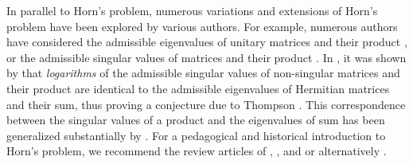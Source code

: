 \documentclass[notitlepage, 10pt]{article}
\begin{document}
In parallel to Horn's problem, numerous variations and extensions of Horn's problem have been explored by various authors.
For example, numerous authors have considered the admissible eigenvalues of unitary matrices and their product \cite{agnihotri1997eigenvalues,belkale2008quantum,belkale2016multiplicative}, or the admissible singular values of matrices and their product \cite{speyer2005horn,thompson1971eigenvaluesviii}.
In \citeyear{klyachko2000random}, it was shown by \cite{klyachko2000random} that \textit{logarithms} of the admissible singular values of non-singular matrices and their product are identical to the admissible eigenvalues of Hermitian matrices and their sum, thus proving a conjecture due to Thompson \cite{klyachko2000random}.
This correspondence between the singular values of a product and the eigenvalues of sum has been generalized substantially by \citeauthor{alekseev2001linearization} \cite{alekseev2001linearization}.
For a pedagogical and historical introduction to Horn's problem, we recommend the review articles of \citeauthor{bhatia2001linear} \cite{bhatia2001linear}, \citeauthor{knutson2000symplectic} \cite{knutson2000symplectic}, and \citeauthor{fulton2000eigenvalues} \cite{fulton2000eigenvalues} or alternatively \cite[Appendix D]{niculescu2006convex}.
\end{document}
